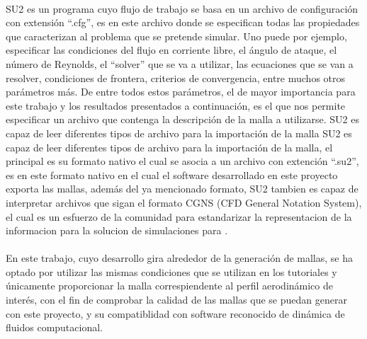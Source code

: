 \documentclass[letterpaper, openright, 12pt]{book}
\begin{document}
    \paragraph*{}
    SU2 es un programa cuyo flujo de trabajo se basa en un archivo de
    configuración con extensión ``.cfg'', es en este archivo donde se
    especifican todas las propiedades que caracterizan al problema que se
    pretende simular. Uno puede por ejemplo, especificar las condiciones del
    flujo en corriente libre, el ángulo de ataque, el número de Reynolds, el
    ``solver'' que se va a utilizar, las ecuaciones que se van a resolver,
    condiciones de frontera, criterios de convergencia, entre muchos otros
    parámetros más. De entre todos estos parámetros, el de mayor importancia
    para este trabajo y los resultados presentados a continuación, es el que
    nos permite especificar un archivo que contenga la descripción de la malla
    a utilizarse. SU2 es capaz de leer diferentes tipos de archivo para la
    importación de la malla SU2 es capaz de leer diferentes tipos de archivo
    para la importación de la malla, el principal es su formato nativo el cual
    se asocia a un archivo con extención ``.su2'', es en este formato nativo en
    el cual el software desarrollado en este proyecto exporta las mallas,
    además del ya mencionado formato, SU2 tambien es capaz de interpretar
    archivos que sigan el formato CGNS (CFD General Notation System), el cual
    es un esfuerzo de la comunidad para estandarizar la representacion de la
    informacion para la solucion de simulaciones para \@DFC.

    \paragraph*{}
    En este trabajo, cuyo desarrollo gira alrededor de la generación de mallas,
    se ha optado por utilizar las mismas condiciones que se utilizan en los
    tutoriales y únicamente proporcionar la malla correspiendente al perfil
    aerodinámico de interés, con el fin de comprobar la calidad de las mallas
    que se puedan generar con este proyecto, y su compatiblidad con software
    reconocido de dinámica de fluidos computacional.
\end{document}
